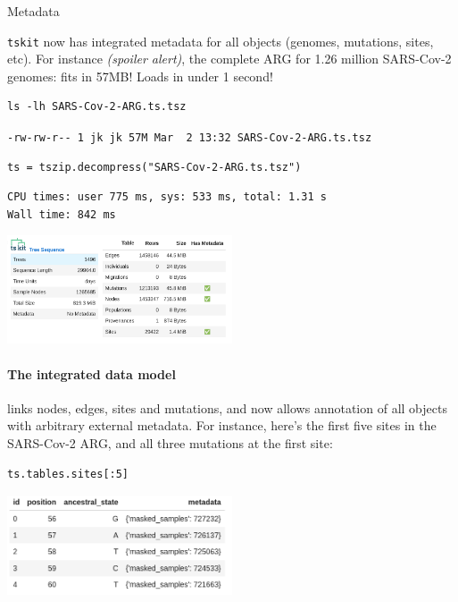 \documentclass[landscape,a0paper,fontscale=0.4]{baposter}
\newcommand{\tskit}{{\texttt{tskit}}}
\begin{document}
\begin{poster}
\begin{posterbox}[name=inout,column=0,span=1,above=bottom]{Metadata}

    \tskit{} now has integrated metadata
    for all objects (genomes, mutations, sites, etc).
    For instance \emph{(spoiler alert)},
    the complete ARG for 1.26 million SARS-Cov-2 genomes: fits in 57MB!
    Loads in under 1 second!

\begin{verbatim}
ls -lh SARS-Cov-2-ARG.ts.tsz
\end{verbatim}
{\scriptsize \verb|-rw-rw-r-- 1 jk jk 57M Mar  2 13:32 SARS-Cov-2-ARG.ts.tsz|}
\begin{verbatim}
ts = tszip.decompress("SARS-Cov-2-ARG.ts.tsz")
\end{verbatim}
{\scriptsize
\begin{verbatim}
CPU times: user 775 ms, sys: 533 ms, total: 1.31 s
Wall time: 842 ms
\end{verbatim}
}
\includegraphics[width=0.5\textwidth]{sc2_ts.png}

\paragraph{The integrated data model}
links nodes, edges, sites and mutations,
and now allows annotation of all objects with arbitrary external metadata.
For instance,
here's the first five sites in the SARS-Cov-2 ARG,
and all three mutations at the first site:

\begin{multicols}{2}
\begin{verbatim}
ts.tables.sites[:5]
\end{verbatim}
\includegraphics[width=0.5\textwidth]{sc2_sites}


\end{multicols}
\end{posterbox}
\end{poster}
\end{document}
